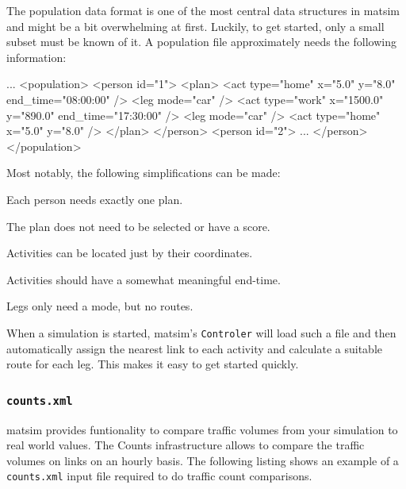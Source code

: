 The population data format is one of the most central data structures in \gls{matsim} and might be a bit overwhelming at first. Luckily, to get started, only a small subset must be known of it.  A population file approximately needs the following information:
\begin{xml}
...
<population> 
   <person id="1"> 
      <plan> 
         <act type="home" x="5.0" y="8.0" end_time="08:00:00" /> 
         <leg mode="car" /> 
         <act type="work" x="1500.0" y="890.0" end_time="17:30:00" /> 
         <leg mode="car" /> 
         <act type="home" x="5.0" y="8.0" /> 
      </plan> 
   </person> 
   <person id="2"> 
      ... 
   </person> 
</population>
\end{xml}
Most notably, the following simplifications can be made:
\begin{compactitem}
\item Each person needs exactly one plan.
\item The plan does not need to be selected or have a score.
\item Activities can be located just by their coordinates.
\item Activities should have a somewhat meaningful end-time.
\item Legs only need a mode, but no routes.
\end{compactitem}
When a simulation is started, \gls{matsim}'s \lstinline|Controler| will load such a file and then automatically assign the nearest link to each activity and calculate a suitable route for each leg. This makes it easy to get started quickly. 



\subsubsection{\lstinline|counts.xml|}
\gls{matsim} provides funtionality to compare traffic volumes from your simulation to real world values. The Counts infrastructure allows to compare the traffic volumes on links on an hourly basis. The following listing shows an example of a \lstinline|counts.xml| input file required to do traffic count comparisons. 

